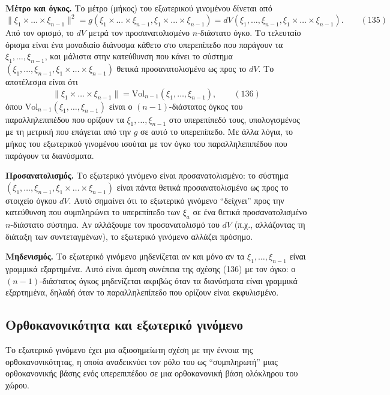 \documentclass[12pt]{article}
\begin{document}
\textbf{Μέτρο και όγκος.} Το μέτρο (μήκος) του εξωτερικού γινομένου δίνεται από
\begin{equation}
\|\xi_1 \times \dots \times \xi_{n-1}\|^2 = g(\xi_1 \times \dots \times \xi_{n-1}, \xi_1 \times \dots \times \xi_{n-1}) = dV(\xi_1, \dots, \xi_{n-1}, \xi_1 \times \dots \times \xi_{n-1}). \qquad (135)
\end{equation}
Από τον ορισμό, το $dV$ μετρά τον προσανατολισμένο $n$-διάστατο όγκο. Το τελευταίο όρισμα είναι ένα μοναδιαίο διάνυσμα κάθετο στο υπερεπίπεδο που παράγουν τα $\xi_1, \dots, \xi_{n-1}$, και μάλιστα στην κατεύθυνση που κάνει το σύστημα $(\xi_1, \dots, \xi_{n-1}, \xi_1 \times \dots \times \xi_{n-1})$ θετικά προσανατολισμένο ως προς το $dV$. Το αποτέλεσμα είναι ότι
\begin{equation}
\|\xi_1 \times \dots \times \xi_{n-1}\| = \text{Vol}_{n-1}(\xi_1, \dots, \xi_{n-1}), \qquad (136)
\end{equation}
όπου $\text{Vol}_{n-1}(\xi_1, \dots, \xi_{n-1})$ είναι ο $(n-1)$-διάστατος όγκος του παραλληλεπιπέδου που ορίζουν τα $\xi_1, \dots, \xi_{n-1}$ στο υπερεπίπεδό τους, υπολογισμένος με τη μετρική που επάγεται από την $g$ σε αυτό το υπερεπίπεδο. Με άλλα λόγια, το μήκος του εξωτερικού γινομένου ισούται με τον όγκο του παραλληλεπιπέδου που παράγουν τα διανύσματα.

\textbf{Προσανατολισμός.} Το εξωτερικό γινόμενο είναι προσανατολισμένο: το σύστημα $(\xi_1, \dots, \xi_{n-1}, \xi_1 \times \dots \times \xi_{n-1})$ είναι πάντα θετικά προσανατολισμένο ως προς το στοιχείο όγκου $dV$. Αυτό σημαίνει ότι το εξωτερικό γινόμενο ``δείχνει'' προς την κατεύθυνση που συμπληρώνει το υπερεπίπεδο των $\xi_a$ σε ένα θετικά προσανατολισμένο $n$-διάστατο σύστημα. Αν αλλάξουμε τον προσανατολισμό του $dV$ (π.χ., αλλάζοντας τη διάταξη των συντεταγμένων), το εξωτερικό γινόμενο αλλάζει πρόσημο.

\textbf{Μηδενισμός.} Το εξωτερικό γινόμενο μηδενίζεται αν και μόνο αν τα $\xi_1, \dots, \xi_{n-1}$ είναι γραμμικά εξαρτημένα. Αυτό είναι άμεση συνέπεια της σχέσης (136) με τον όγκο: ο $(n-1)$-διάστατος όγκος μηδενίζεται ακριβώς όταν τα διανύσματα είναι γραμμικά εξαρτημένα, δηλαδή όταν το παραλληλεπίπεδο που ορίζουν είναι εκφυλισμένο.

\subsection{Ορθοκανονικότητα και εξωτερικό γινόμενο}

Το εξωτερικό γινόμενο έχει μια αξιοσημείωτη σχέση με την έννοια της ορθοκανονικότητας, η οποία αναδεικνύει τον ρόλο του ως ``συμπληρωτή'' μιας ορθοκανονικής βάσης ενός υπερεπιπέδου σε μια ορθοκανονική βάση ολόκληρου του χώρου.
\end{document}
